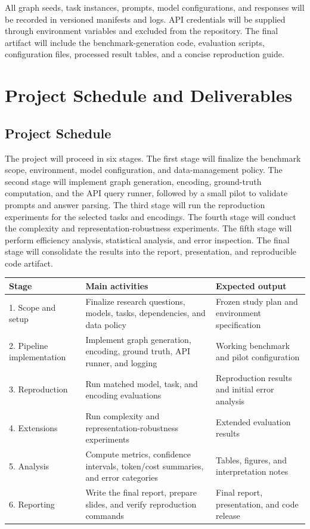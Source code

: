 \documentclass[11pt,a4paper]{article}
\begin{document}
All graph seeds, task instances, prompts, model configurations, and responses will be recorded in versioned manifests and logs. API credentials will be supplied through environment variables and excluded from the repository. The final artifact will include the benchmark-generation code, evaluation scripts, configuration files, processed result tables, and a concise reproduction guide.

\section{Project Schedule and Deliverables}

\subsection{Project Schedule}

The project will proceed in six stages. The first stage will finalize the benchmark scope, environment, model configuration, and data-management policy. The second stage will implement graph generation, encoding, ground-truth computation, and the API query runner, followed by a small pilot to validate prompts and answer parsing. The third stage will run the reproduction experiments for the selected tasks and encodings. The fourth stage will conduct the complexity and representation-robustness experiments. The fifth stage will perform efficiency analysis, statistical analysis, and error inspection. The final stage will consolidate the results into the report, presentation, and reproducible code artifact.

\begin{table}[htbp]
\centering
\begin{tabularx}{\textwidth}{p{} X p{}}
\toprule
Stage & Main activities & Expected output \\
\midrule
1. Scope and setup & Finalize research questions, models, tasks, dependencies, and data policy & Frozen study plan and environment specification \\
2. Pipeline implementation & Implement graph generation, encoding, ground truth, API runner, and logging & Working benchmark and pilot configuration \\
3. Reproduction & Run matched model, task, and encoding evaluations & Reproduction results and initial error analysis \\
4. Extensions & Run complexity and representation-robustness experiments & Extended evaluation results \\
5. Analysis & Compute metrics, confidence intervals, token/cost summaries, and error categories & Tables, figures, and interpretation notes \\
6. Reporting & Write the final report, prepare slides, and verify reproduction commands & Final report, presentation, and code release \\
\bottomrule
\end{tabularx}
\end{table}
\end{document}
